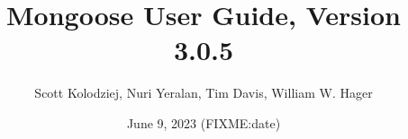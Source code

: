 \title{Mongoose User Guide, Version 3.0.5}
\author{Scott Kolodziej, Nuri Yeralan, Tim Davis, William W. Hager}
\date{June 9, 2023 (FIXME:date)}
